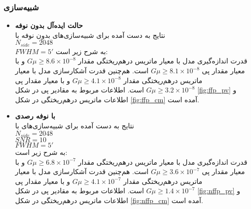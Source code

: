   \subsubsection{  	شبیه‌سازی  }
   	\begin{itemize}
   		\item \textbf{حالت ایده‌آل بدون نوفه} \\
   		   	نتایج به دست آمده برای شبیه‌سازی‌های بدون نوفه
   		   	با\\
   		$N_{side} = 2048$ \\
   		$FWHM = 5'$
   		  به شرح زیر است:\\
   		قدرت اندازه‌گیری مدل با معیار ماتریس در‌هم‌ریختگی مقدار 
   		$G\mu \geq 8.6\times 10^{-8}$
   		و با معیار مقدار پی 
   		$G\mu \geq 8.1\times 10^{-8}$
   		است. هم‌چنین قدرت آشکارسازی مدل با معیار ماتریس در‌هم‌ریختگی مقدار
   		$G\mu \geq 4.1\times 10^{-8}$
   		و با معیار مقدار پی 
   		$G\mu \geq 3.2\times 10^{-8}$
   		است.
   		اطلاعات مربوط به مقادیر پی در شکل
   		\ref{fig:ffp_pv}
   		و اطلاعات ماتریس درهم‌ریختگی در شکل
   		\ref{fig:ffp_cm}
   		آمده است.
   		
		\item \textbf{با نوفه رصدی} \\
		نتایج به دست آمده برای شبیه‌سازی‌های 
		با\\
		 $N_{side} = 2048$ \\
 		 $SNR=10$\\
		 $FWHM = 5'$\\
		 به شرح زیر است:\\
		 قدرت اندازه‌گیری مدل با معیار ماتریس در‌هم‌ریختگی مقدار 
		 $G\mu \geq 6.8\times 10^{-7}$
		 و با معیار مقدار پی 
		 $G\mu \geq 3.6\times 10^{-7}$
		 است. هم‌چنین قدرت آشکارسازی مدل با معیار ماتریس در‌هم‌ریختگی مقدار
		 $G\mu \geq 4.1\times 10^{-7}$
		 و با معیار مقدار پی 
		 $G\mu \geq 1.4\times 10^{-7}$
		 است.
		 اطلاعات مربوط به مقادیر پی در شکل
		 \ref{fig:nffp_pv}
		 و اطلاعات ماتریس درهم‌ریختگی در شکل
		 \ref{fig:nffp_cm}
		 آمده است.
		
		 
   	\end{itemize}

